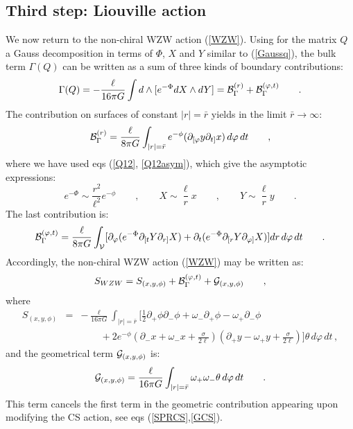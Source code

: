 \documentclass[a4paper,10pt]{article}
\begin{document}
\subsection{Third step: Liouville action}

We now return to the non-chiral WZW action (\ref{WZW}). 
Using for the matrix $Q$ a Gauss decomposition in terms of 
$\Phi$, $X$ and $Y$ similar to (\ref{Gaussq}),
the bulk term $\Gamma (Q)$ can be written as a sum of three
kinds of boundary contributions:
\begin{equation}
\Gamma(Q)=- \frac {\ell} {16 \pi G} \int d \wedge [e^{-\Phi} dX \wedge dY]
={\cal B}^{(r)}_\Gamma +  {\cal B}^{(\varphi,t)}_\Gamma
\qquad .
\end{equation}
The contribution on surfaces of 
constant $|r|=\bar r$ yields in the limit $\bar r \rightarrow \infty$:
\begin{equation}
\label{BG}
{\cal B}^{(r)}_\Gamma= \frac {\ell} {8 \pi G} \int_{|r|=\bar r} 
e^{-\phi}( \partial_{[\varphi} y \partial_{t]} x ) \, d\varphi \, dt
 \qquad ,
\end{equation}
where we have used eqs (\ref{Q12}, \ref{Q12asym}), which give
the asymptotic expressions:
\begin{equation}
\label{AXYPHI}
e^{-\Phi}\sim \frac {r^2}{\ell^2} e^{-\phi} \qquad , \qquad
X \sim \frac \ell r x  \qquad , \qquad Y \sim \frac \ell r y 
\qquad .
\end{equation}
The last contribution is:
\begin{equation}
\label{BL}
{\cal B}^{(\varphi,t)}_\Gamma  = \frac {\ell} {8 \pi G} 
\int_{\cal V} [ \partial_\varphi
( e^{-\Phi} \partial_{[t} Y \partial_{r]} X) +
\partial_t
( e^{-\Phi} \partial_{[r} Y \partial_{\varphi]} X)]
 dr\, d\varphi\, dt \qquad .
\end{equation}
Accordingly, the non-chiral WZW action (\ref{WZW}) may be written as:
\begin{equation}
\label{WZWXY}
S_{WZW}= S_{(x,y,\phi)} + {\cal B}^{(\varphi,t)}_\Gamma 
+ {\cal G}_{(x,y,\phi)}\qquad ,
\end{equation}
where 
\begin{eqnarray}
\label{SXYPHI}
S_{(x,y,\phi)}&=& - \frac {\ell}  {16 \pi G}
 \int_{|r|=\bar r }[ \frac 1 2 \partial_+ \phi \partial_- \phi 
+ \omega_-  \partial_+ \phi - \omega_+  \partial_- \phi \qquad \qquad
\nonumber \\
&& \quad \quad 
 + 2  e^{-\phi} (\partial_- x +\omega_- x +\frac {\sigma}{2 \ell})
(\partial_+ y - \omega_+ y +\frac {\sigma}{2 \ell})] \theta \, d\varphi \, dt
\, , 
\end{eqnarray}
and the geometrical term ${\cal G}_{(x,y,\phi)}$ is:
\begin{equation}
\label{GXY}
{\cal G}_{(x,y,\phi)}=  \frac {\ell}  {16 \pi G} \int_{|r|=\bar r }
\omega_+ \omega_- \theta \, d\varphi \, dt \qquad .
\end{equation}
This term cancels the first term in the geometric contribution
appearing upon modifying the CS action, see eqs (\ref{SPRCS},\ref{GCS}). 
 
\end{document}
